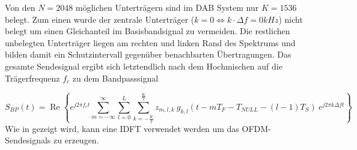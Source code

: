 Von den $N = 2048$ möglichen Unterträgern sind im DAB System nur $K = 1536$ belegt. Zum einen wurde der zentrale Unterträger ($k=0 \Leftrightarrow k\cdot \Delta f = 0kHz$) nicht belegt um einen Gleichanteil im Basisbandsignal zu vermeiden. Die restlichen unbelegten Unterträger liegen am rechten und linken Rand des Spektrums und bilden damit ein Schutzintervall gegenüber benachbarten Übertragungen.
Das gesamte Sendesignal ergibt sich letztendlich nach dem Hochmischen auf die Trägerfrequenz $f_c$ zu dem Bandpasssignal

\begin{equation}
S_{BP}(t) = \operatorname{Re} \left\{e^{j2 \pi f_c t} \sum \limits_{m=-\infty}^{\infty} \sum \limits_{l=0}^{L}   \sum \limits_{k=- \frac{K}{2}}^{\frac{K}{2}} z_{m,l,k} \: g_{k,l}(t-mT_F-T_{NULL}-(l-1)T_S) \: e^{j2\pi k \Delta f t}\right\}
\end{equation}
Wie in \cite{ofdm:idft} gezeigt wird, kann eine \ac{IDFT} verwendet werden um das OFDM-Sendesignals zu erzeugen.